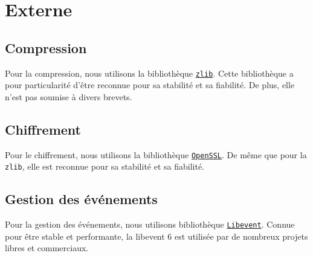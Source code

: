 ﻿\section{Externe}
\subsection{Compression}
Pour la compression, nous utilisons la bibliothèque \href{http://zlib.net/}{\texttt{zlib}}.
Cette bibliothèque a pour particularité d'être reconnue pour sa stabilité et sa fiabilité.
De plus, elle n'est pas soumise à divers brevets.

\subsection{Chiffrement}
Pour le chiffrement, nous utilisons la bibliothèque \href{http://www.openssl.org/}{\texttt{OpenSSL}}.
De même que pour la \texttt{zlib}, elle est reconnue pour sa stabilité et sa fiabilité.


\subsection{Gestion des événements}
Pour la gestion des événements, nous utilisons bibliothèque \href{http://libevent.org/}{\texttt{Libevent}}.
Connue pour être stable et performante, la libevent 6 est utilisée
par de nombreux projets libres et commerciaux.

